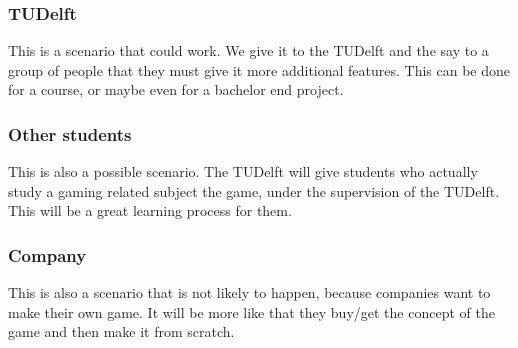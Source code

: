 \documentclass[11pt,twoside,a4paper]{article}
\begin{document}
\subsubsection{TUDelft}
This is a scenario that could work. We give it to the TUDelft and the say to a group of people that they must give it more additional features. This can be done for a course, or maybe even for a bachelor end project.
\subsubsection{Other students}
This is also a possible scenario. The TUDelft will give students who actually study a gaming related subject the game, under the supervision of the TUDelft. This will be a great learning process for them.
\subsubsection{Company}
This is also a scenario that is not likely to happen, because companies want to make their own game. It will be more like that they buy/get the concept of the game and then make it from scratch.
\end{document}
